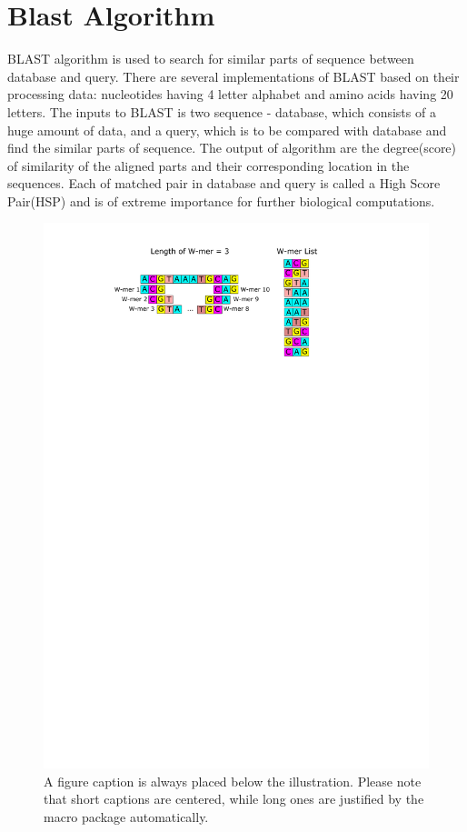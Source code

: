 \section{Blast Algorithm}
\label{sec:introduction}

BLAST algorithm is used to search for similar parts of sequence between database and query. There are several implementations of BLAST based on their processing data: nucleotides having 4 letter alphabet and amino acids having 20 letters. The inputs to BLAST is two sequence - database, which consists of a huge amount of data, and a query, which is to be compared with database and find the similar parts of sequence. The output of algorithm are the degree(score) of similarity of the aligned parts and their corresponding location in the sequences. Each of matched pair in database and query is called a High Score Pair(HSP) and is of extreme importance for further biological computations. 
\\
\begin{figure}
\includegraphics[width=\textwidth]{Figures/Algorithm1.pdf}
\caption{A figure caption is always placed below the illustration.
Please note that short captions are centered, while long ones are
justified by the macro package automatically.} \label{fig1}
\end{figure}
